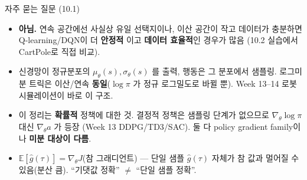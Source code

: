 \begin{frame}{자주 묻는 질문 (10.1)}
  \small
  \begin{itemize}
    \item {}
      \textbf{아님.} 연속 공간에선 사실상 유일 선택지이나, 이산
      공간이 작고 데이터가 충분하면 Q-learning/DQN이 더 \textbf{안정적}
      이고 \textbf{데이터 효율적}인 경우가 많음 (10.2 실습에서
      CartPole로 직접 비교).
    \item {}
      신경망이 정규분포의 $\mu_\theta(s),\sigma_\theta(s)$ 를 출력,
      행동은 그 분포에서 샘플링. 로그미분 트릭은 이산/연속
      \textbf{동일}($\log\pi$ 가 정규 로그밀도로 바뀔 뿐).
      Week 13--14 로봇 시뮬레이션이 바로 이 구조.
    \item {}
      이 정리는 \textbf{확률적} 정책에 대한 것. 결정적 정책은
      샘플링 단계가 없으므로 $\nabla_\theta\log\pi$ 대신
      $\nabla_\theta a$ 가 등장 (Week 13 DDPG/TD3/SAC).
      둘 다 policy gradient family이나 \textbf{미분 대상이 다름}.
    \item {}
      $\mathbb{E}[\hat g(\tau)] = \nabla_\theta J$(참 그래디언트) ---
      단일 샘플 $\hat g(\tau)$ 자체가 참 값과 멀어질 수 있음(분산 큼).
      ``기댓값 정확'' $\ne$ ``단일 샘플 정확''.
  \end{itemize}
  \normalsize
\end{frame}
